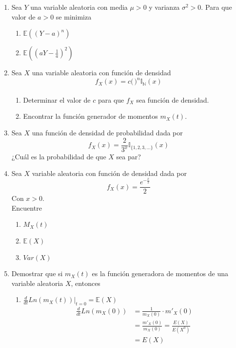 \documentclass[12pt,a4paper]{report}
\begin{document}
\begin{enumerate}
		\item{
			Sea $Y$ una variable aleatoria con media $\mu > 0$ y varianza
			$\sigma^2 > 0$. Para que valor de $a > 0$ se minimiza
			\begin{enumerate}
				\item {
					$\mathbb{E}((Y-a)^n)$
				}

				\item {
					$\mathbb{E}((aY-\frac{1}{a})^2)$
				}
			\end{enumerate}
		}

		\item{
			Sea $X$ una variable aleatoria con función de densidad
			\[f_X(x) = c \Big(\frac{}{}\Big)^n \mathbb{I}_{\mathbb{N}}(x)\]
			\begin{enumerate}
				\item {
					Determinar el valor de $c$ para que $f_X$ sea función de
					densidad.
				}

				\item {
					Encontrar la función generador de momentos $m_X(t)$.
				}
			\end{enumerate}
		}

		\item{
			Sea $X$ una función de densidad de probabilidad dada por
			\[f_X(x) = \frac{2}{3^x} \mathbb{I}_{\{1, 2, 3, ...\}}(x)\]
			¿Cuál es la probabilidad de que $X$ sea par?
		}

		\item{
			Sea $X$ variable aleatoria con función de densidad dada por
			\[f_X(x) = \frac{e^{-\frac{x}{2}}}{2}\]
			Con $x > 0$.\\
			Encuentre
			\begin{enumerate}
				\item {
					$M_X(t)$
				}

				\item {
					$\mathbb{E}(X)$
				}

				\item {
					$Var(X)$
				}
			\end{enumerate}
		}

		\item{
			Demostrar que si $m_X(t)$ es la función generadora de momentos de
			una variable aleatoria $X$, entonces
			\begin{enumerate}
				\item {
				$\frac{d}{dt}Ln(m_X(t))|_{t = 0} = \mathbb{E}(X)$
				\begin{align*}
					\frac{d}{dt}Ln(m_X(0)) &= \frac{1}{m_X(0)} \cdot m'_X(0)\\
					&= \frac{m'_X(0)}{m_X(0)} = \frac{E(X)}{E(X^0)}\\
					&= E(X)
				\end{align*}
				}


\end{enumerate}}
\end{enumerate}
\end{document}
